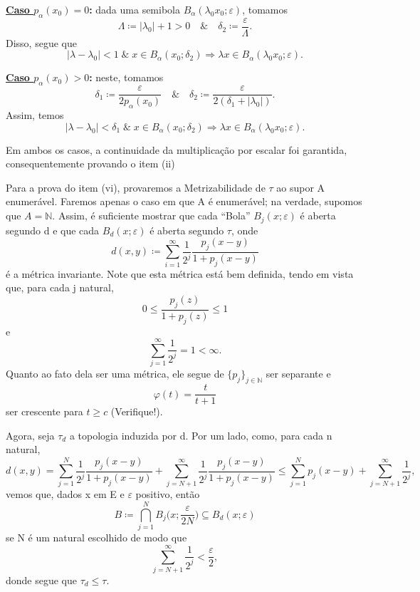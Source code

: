 \documentclass[../distribution_theory_notes.tex]{subfiles}
\begin{document}
\begin{proof*}
	\textbf{\underline{Caso \(p_{\alpha }(x_{0})=0\)}:} dada uma semibola \(B_{\alpha }(\lambda_{0}x_{0}; \varepsilon )\), tomamos
	\[
		\Lambda \coloneqq |\lambda_{0}| + 1 > 0 \quad\&\quad \delta_{2}\coloneqq \frac{\varepsilon }{\Lambda }.
	\]
	Disso, segue que
	\[
		|\lambda -\lambda_{0}|<1\;\&\; x\in B_{\alpha }(x_{0}; \delta_{2}) \Rightarrow \lambda x\in B_{\alpha }(\lambda_{0}x_{0}; \varepsilon ).
	\]

	\textbf{\underline{Caso \(p_{\alpha }(x_{0})>0\)}:} neste, tomamos
	\[
		\delta_1\coloneqq \frac{\varepsilon }{2p_{\alpha }(x_{0})} \quad\&\quad \delta_{2}\coloneqq \frac{\varepsilon }{2(\delta_{1}+|\lambda_{0}|)}.
	\]
	Assim, temos
	\[
		|\lambda -\lambda_{0}|<\delta_1 \;\&\; x\in B_{\alpha }(x_{0}; \delta_{2})\Rightarrow \lambda x\in B_{\alpha }(\lambda_{0}x_{0}; \varepsilon ).
	\]

	Em ambos os casos, a continuidade da multiplicação por escalar foi garantida, consequentemente provando o item (ii)

	Para a prova do item (vi), provaremos a Metrizabilidade de \(\tau \) ao supor A enumerável. Faremos apenas o caso em que A é enumerável; na verdade, supomos que \(A=\mathbb{N}.\) Assim, é suficiente mostrar que cada ``Bola'' \(B_{j}(x; \varepsilon )\) é aberta segundo d e que cada \(B_{d}(x; \varepsilon )\) é aberta segundo \(\tau \), onde
	\[
		d(x, y)\coloneqq \sum\limits_{i=1}^{\infty}\frac{1}{2^{j}}\frac{p_{j}(x-y)}{1+p_{j}(x-y)}
	\]
	é a métrica invariante. Note que esta métrica está bem definida, tendo em vista que, para cada j natural,
	\[
		0\leq \frac{p_{j}(z)}{1+p_{j}(z)}\leq 1
	\]
	e
	\[
		\sum\limits_{j=1}^{\infty}\frac{1}{2^{j}}=1<\infty.
	\]
	Quanto ao fato dela ser uma métrica, ele segue de \(\{p_{j}\}_{j\in \mathbb{N}}\) ser separante e
	\[
		\varphi (t)=\frac{t}{t+1}
	\]
	ser crescente para \(t\geq c\) (Verifique!).

	Agora, seja \(\tau_{d}\) a topologia induzida por d. Por um lado, como, para cada n natural,
	\[
		d(x, y)=\sum\limits_{j=1}^{N}\frac{1}{2^{j}}\frac{p_{j}(x-y)}{1+p_{j}(x-y)} + \sum\limits_{j=N+1}^{\infty}\frac{1}{2^{j}}\frac{p_{j}(x-y)}{1+p_{j}(x-y)} \leq \sum\limits_{j=1}^{N}p_{j}(x-y)+\sum\limits_{j=N+1}^{\infty}\frac{1}{2^j},
	\]
	vemos que, dados x em E e \(\varepsilon \) positivo, então
	\[
		B\coloneqq \bigcap_{j=1}^{N}B_{j}\biggl(x; \frac{\varepsilon }{2N}\biggr)\subseteq B_{d}(x; \varepsilon )
	\]
	se N é um natural escolhido de modo que
	\[
		\sum\limits_{j=N+1}^{\infty}\frac{1}{2^{j}}<\frac{\varepsilon }{2},
	\]
	donde segue que \(\tau_{d}\leq \tau \).


\end{proof*}
\end{document}
